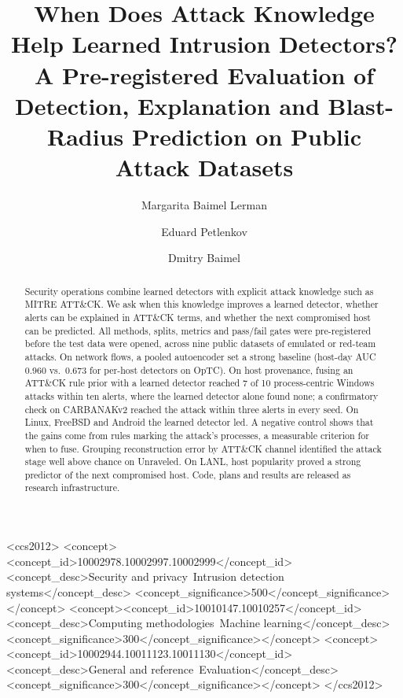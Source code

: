 \documentclass[acmlarge,screen,review]{acmart}
\begin{document}
\sloppy

\title[When Does Attack Knowledge Help Learned Intrusion Detectors?]{When Does Attack Knowledge Help Learned Intrusion
Detectors? A Pre-registered Evaluation of Detection, Explanation and Blast-Radius Prediction on Public Attack Datasets}

\author{Margarita Baimel Lerman}
\author{Eduard Petlenkov}
\author{Dmitry Baimel}
\renewcommand{\shortauthors}{Baimel Lerman et al.}

\begin{abstract}
Security operations combine learned detectors with explicit attack knowledge such as MITRE ATT\&CK. We ask when this
knowledge improves a learned detector, whether alerts can be explained in ATT\&CK terms, and whether the next
compromised host can be predicted. All methods, splits, metrics and pass/fail gates were pre-registered before the
test data were opened, across nine public datasets of emulated or red-team attacks. On network flows, a pooled
autoencoder set a strong baseline (host-day AUC 0.960 vs.\ 0.673 for per-host detectors on OpTC). On host provenance,
fusing an ATT\&CK rule prior with a learned detector reached 7 of 10 process-centric Windows attacks within ten
alerts, where the learned detector alone found none; a confirmatory check on CARBANAKv2 reached the attack within
three alerts in every seed. On Linux, FreeBSD and Android the learned detector led. A negative control shows that the
gains come from rules marking the attack's processes, a measurable criterion for when to fuse. Grouping
reconstruction error by ATT\&CK channel identified the attack stage well above chance on Unraveled. On LANL, host
popularity proved a strong predictor of the next compromised host. Code, plans and results are released as research
infrastructure.
\end{abstract}

\begin{CCSXML}
<ccs2012>
 <concept><concept_id>10002978.10002997.10002999</concept_id>
  <concept_desc>Security and privacy~Intrusion detection systems</concept_desc>
  <concept_significance>500</concept_significance></concept>
 <concept><concept_id>10010147.10010257</concept_id>
  <concept_desc>Computing methodologies~Machine learning</concept_desc>
  <concept_significance>300</concept_significance></concept>
 <concept><concept_id>10002944.10011123.10011130</concept_id>
  <concept_desc>General and reference~Evaluation</concept_desc>
  <concept_significance>300</concept_significance></concept>
</ccs2012>
\end{CCSXML}
\end{document}
